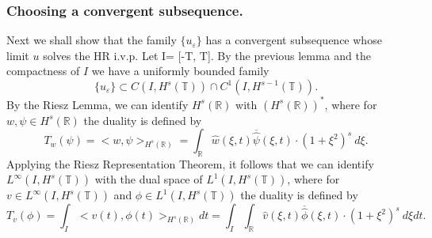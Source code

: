 \documentclass{beamer}
\newcommand{\rr}{\mathbb{R}}
\newcommand{\ci}{\mathbb{T}}
\newcommand{\ee}{\varepsilon}
\begin{document}
%
%
\begin{frame}
	\frametitle{Choosing  a convergent subsequence.}
%
Next we shall show that the family $\{ u_\ee\}$ has a convergent 
subsequence
whose limit $u$ solves the HR i.v.p.  Let I= [-T, T]. By the previous lemma and the compactness of $I$ we have a uniformly bounded 
family
%
%
%
\begin{equation*}
\label{Lip-1-fam}
\{u_\ee\}\subset C(I, H^s(\ci))\cap C^1(I,
H^{s-1}(\ci)).
\end{equation*}
%
%
%
%
By the Riesz Lemma, we can identify $H^s(\rr)$ with
$(H^s(\rr))^*$, where for $w, \psi \in H^s(\rr)$ the duality is
defined by 
\begin{equation*}
	T_w(\psi) = <w, \psi>_{H^s(\rr)} = \int_{\rr}
\widehat{w}(\xi, t) \overline{\widehat{\psi}}(\xi, t) \cdot (1
+ \xi^2)^s \ d \xi.
\end{equation*}
Applying the Riesz Representation Theorem, it follows that we 
can identify \\ $L^\infty(I, H^s(\ci)) $ with the dual space of $L^1(I,
H^{s}(\ci))$, where for $v\in L^\infty(I, H^s(\ci)) $ and $ \phi \in
L^1(I, H^{s}(\ci))$ the duality is defined by  
%
%
%
\begin{equation*}
T_v(\phi) = \int_I <v (t), \phi (t)>_{H^s(\rr)} dt  = \int_I
\int_{\rr}
\widehat{v}(\xi, t) \overline{\widehat{\phi}}(\xi, t) \cdot (1
+ \xi^2)^s \ d \xi dt.
\end{equation*}
%
%
%
\end{frame}
\end{document}
